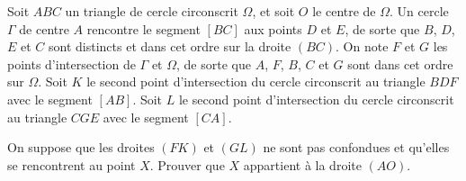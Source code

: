 Soit $ABC$ un triangle de cercle circonscrit $\Omega$, et soit $O$ le centre de $\Omega$. Un cercle $\Gamma$ de
centre $A$ rencontre le segment $[BC]$ aux points $D$ et $E$, de sorte que $B$, $D$, $E$ et $C$ sont distincts
et dans cet ordre sur la droite $(BC)$. On note $F$ et $G$ les points d'intersection de $\Gamma$ et $\Omega$,
de sorte que $A$, $F$, $B$, $C$ et $G$ sont dans cet ordre sur $\Omega$. Soit $K$ le second point
d'intersection du cercle circonscrit au triangle $BDF$ avec le segment $[AB]$. Soit $L$ le second point
d'intersection du cercle circonscrit au triangle $CGE$ avec le segment $[CA]$.

On suppose que les droites $(FK)$ et $(GL)$ ne sont pas confondues et qu'elles se rencontrent au point $X$.
Prouver que $X$ appartient à la droite $(AO)$.

